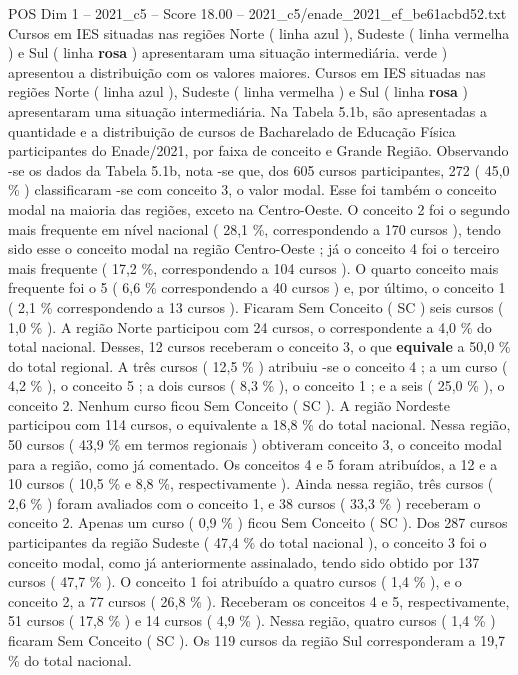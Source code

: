 \begin{textsample}{POS Dim 1 – 2021\_c5 – Score 18.00 – 2021\_c5/enade\_2021\_ef\_be61acbd52.txt}
Cursos em IES situadas nas regiões Norte ( linha azul ), Sudeste ( linha vermelha ) e Sul ( linha \textbf{rosa} ) apresentaram uma situação intermediária. verde ) apresentou a distribuição com os valores maiores.
Cursos em IES situadas nas regiões Norte ( linha azul ), Sudeste ( linha vermelha ) e Sul ( linha \textbf{rosa} ) apresentaram uma situação intermediária.
Na Tabela 5.1b, são apresentadas a quantidade e a distribuição de cursos de Bacharelado de Educação Física participantes do Enade/2021, por faixa de conceito e Grande Região.
Observando -se os dados da Tabela 5.1b, nota -se que, dos 605 cursos participantes, 272 ( 45,0 \% ) classificaram -se com conceito 3, o valor modal.
Esse foi também o conceito modal na maioria das regiões, exceto na Centro-Oeste.
O conceito 2 foi o segundo mais frequente em nível nacional ( 28,1 \%, correspondendo a 170 cursos ), tendo sido esse o conceito modal na região Centro-Oeste ; já o conceito 4 foi o terceiro mais frequente ( 17,2 \%, correspondendo a 104 cursos ).
O quarto conceito mais frequente foi o 5 ( 6,6 \% correspondendo a 40 cursos ) e, por último, o conceito 1 ( 2,1 \% correspondendo a 13 cursos ).
Ficaram Sem Conceito ( SC ) seis cursos ( 1,0 \% ).
A região Norte participou com 24 cursos, o correspondente a 4,0 \% do total nacional.
Desses, 12 cursos receberam o conceito 3, o que \textbf{equivale} a 50,0 \% do total regional.
A três cursos ( 12,5 \% ) atribuiu -se o conceito 4 ; a um curso ( 4,2 \% ), o conceito 5 ; a dois cursos ( 8,3 \% ), o conceito 1 ; e a seis ( 25,0 \% ), o conceito 2.
Nenhum curso ficou Sem Conceito ( SC ).
A região Nordeste participou com 114 cursos, o equivalente a 18,8 \% do total nacional.
Nessa região, 50 cursos ( 43,9 \% em termos regionais ) obtiveram conceito 3, o conceito modal para a região, como já comentado.
Os conceitos 4 e 5 foram atribuídos, a 12 e a 10 cursos ( 10,5 \% e 8,8 \%, respectivamente ).
Ainda nessa região, três cursos ( 2,6 \% ) foram avaliados com o conceito 1, e 38 cursos ( 33,3 \% ) receberam o conceito 2.
Apenas um curso ( 0,9 \% ) ficou Sem Conceito ( SC ).
Dos 287 cursos participantes da região Sudeste ( 47,4 \% do total nacional ), o conceito 3 foi o conceito modal, como já anteriormente assinalado, tendo sido obtido por 137 cursos ( 47,7 \% ).
O conceito 1 foi atribuído a quatro cursos ( 1,4 \% ), e o conceito 2, a 77 cursos ( 26,8 \% ).
Receberam os conceitos 4 e 5, respectivamente, 51 cursos ( 17,8 \% ) e 14 cursos ( 4,9 \% ).
Nessa região, quatro cursos ( 1,4 \% ) ficaram Sem Conceito ( SC ).
Os 119 cursos da região Sul corresponderam a 19,7 \% do total nacional.

\end{textsample}
